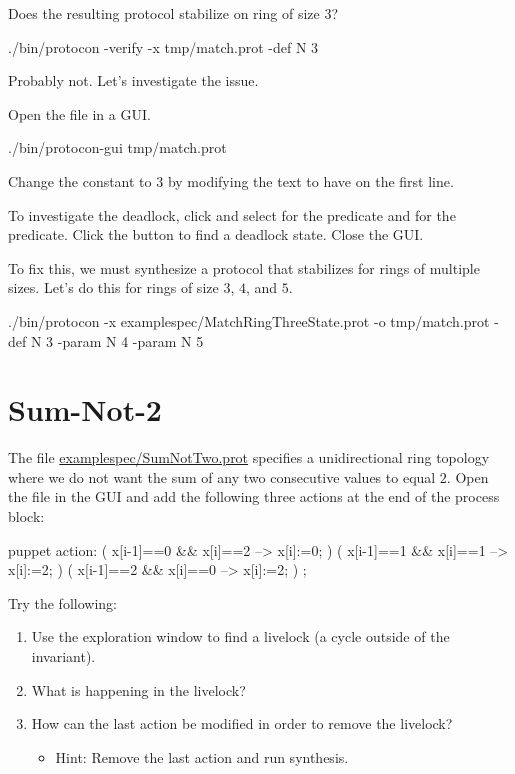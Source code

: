 Does the resulting protocol stabilize on ring of size $3$?
\begin{code}
./bin/protocon -verify -x tmp/match.prot -def N 3
\end{code}
Probably not. Let's investigate the issue.

Open the file in a GUI.
\begin{code}
./bin/protocon-gui tmp/match.prot
\end{code}
Change the constant  to $3$ by modifying the text to have  on the first line.

To investigate the deadlock, click  and select  for the  predicate and  for the  predicate.
Click the  button to find a deadlock state.
Close the GUI.

To fix this, we must synthesize a protocol that stabilizes for rings of multiple sizes.
Let's do this for rings of size $3$, $4$, and $5$.
\begin{code}
./bin/protocon -x examplespec/MatchRingThreeState.prot -o tmp/match.prot -def N 3 -param N 4 -param N 5
\end{code}


\section{Sum-Not-2}

The file \href{\examplespec/SumNotTwo.prot}{examplespec/SumNotTwo.prot} specifies a unidirectional ring topology where we do not want the sum of any two consecutive values to equal $2$.
Open the file in the GUI and add the following three actions at the end of the process block:
\begin{code}
  puppet action:
    ( x[i-1]==0 && x[i]==2 --> x[i]:=0; )
    ( x[i-1]==1 && x[i]==1 --> x[i]:=2; )
    ( x[i-1]==2 && x[i]==0 --> x[i]:=2; )
    ;
\end{code}

Try the following:
\begin{enumerate}
\item Use the exploration window to find a livelock (a cycle outside of the invariant).
\item What is happening in the livelock?
\item How can the last action be modified in order to remove the livelock?
 \begin{itemize}
 \item Hint: Remove the last action and run synthesis.
 \end{itemize}
\end{enumerate}


